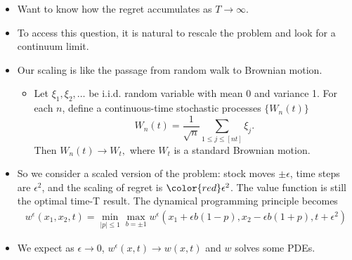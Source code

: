 \documentclass{beamer}
\begin{document}
\begin{frame}
\begin{itemize}
\item Want to know how the regret accumulates as $T\to \infty$.
\item To access this question, it is natural to rescale the problem and look for a continuum limit.
\item Our scaling is like the passage from random walk to Brownian motion.
 \begin{itemize}
 \item Let $\xi_1,\xi_2,\ldots$ be i.i.d. random variable with mean 0 and variance 1. For each $n$, define a continuous-time stochastic processes $\{W_n(t)\}$
 $$W_n(t) = \frac{1}{\sqrt{n}}\sum_{1\le j\le [nt]}\xi_j.$$ 
Then $W_n(t)\to W_t,$ where $W_t$ is a standard Brownian motion.
\end{itemize}

\end{itemize}

\end{frame}

\begin{frame}
\begin{itemize}
\item So we consider a {\color{red}scaled} version of the problem: stock moves {\color{red}$\pm \epsilon$}, time steps are {\color{red}$ \epsilon^2$}, and the scaling of regret is ${\color{red}\epsilon^2}$. The value function is still the optimal time-T result.  The dynamical programming principle becomes
\begin{align*}
w^\epsilon(x_1,x_2,t) = \min_{|p|\le 1}\max_{b = \pm 1} w^\epsilon(x_1 + \epsilon b(1-p),x_2-\epsilon b(1+p),t+\epsilon^2)
\end{align*}
\item We expect as $\epsilon\to 0$, $w^\epsilon(x,t)\to w(x,t)$ and $w$ solves some PDEs.
\end{itemize}

\end{frame}
\end{document}
